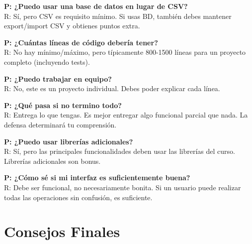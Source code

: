 \documentclass[12pt,a4paper]{article}
\begin{document}
\textbf{P: ¿Puedo usar una base de datos en lugar de CSV?}\\
R: Sí, pero CSV es requisito mínimo. Si usas BD, también debes mantener export/import CSV y obtienes puntos extra.

\textbf{P: ¿Cuántas líneas de código debería tener?}\\
R: No hay mínimo/máximo, pero típicamente 800-1500 líneas para un proyecto completo (incluyendo tests).

\textbf{P: ¿Puedo trabajar en equipo?}\\
R: No, este es un proyecto individual. Debes poder explicar cada línea.

\textbf{P: ¿Qué pasa si no termino todo?}\\
R: Entrega lo que tengas. Es mejor entregar algo funcional parcial que nada. La defensa determinará tu comprensión.

\textbf{P: ¿Puedo usar librerías adicionales?}\\
R: Sí, pero las principales funcionalidades deben usar las librerías del curso. Librerías adicionales son bonus.

\textbf{P: ¿Cómo sé si mi interfaz es suficientemente buena?}\\
R: Debe ser funcional, no necesariamente bonita. Si un usuario puede realizar todas las operaciones sin confusión, es suficiente.

\section{Consejos Finales}
\end{document}
